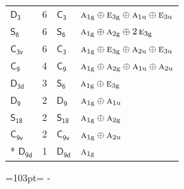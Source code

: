 \documentclass[10pt,a4paper]{article}
\newcommand{\needspace}[1]{\par\penalty-100\begingroup\dimen0=#1\relax\dimen2=\pagegoal
  \advance\dimen2-\pagetotal\ifdim\dimen0>\dimen2\relax\ifdim\dimen2>0pt\vfil\break\fi\fi
  \endgroup}
\numberwithin{equation}{section}
\newcommand{\grp}[1]{\mathsf{#1}}
\newcommand{\irr}[1]{\text{\normalfont\scshape #1}}
\newcommand{\ptag}[1]{\mathrm{#1}}
\newlength{\fillwidth}\newlength{\cellwidth}\newlength{\colwidth}
\begin{document}
{\begin{longtable}{@{}lrl>{\RaggedRight\arraybackslash}p{\fillwidth}@{}}
\href{D3.pdf}{$\grp{D_{3}}$} & 6 & \href{C3.pdf}{$\grp{C_{3}}$} & $\irr{a}_{1\ptag{g}}\oplus \irr{e}_{3\ptag{g}}\oplus \irr{a}_{1\ptag{u}}\oplus \irr{e}_{3\ptag{u}}$\\
\href{S6.pdf}{$\grp{S_{6}}$} & 6 & \href{S6.pdf}{$\grp{S_{6}}$} & $\irr{a}_{1\ptag{g}}\oplus \irr{a}_{2\ptag{g}}\oplus 2\,\irr{e}_{3\ptag{g}}$\\
\href{C3v.pdf}{$\grp{C_{3v}}$} & 6 & \href{C3.pdf}{$\grp{C_{3}}$} & $\irr{a}_{1\ptag{g}}\oplus \irr{e}_{3\ptag{g}}\oplus \irr{a}_{2\ptag{u}}\oplus \irr{e}_{3\ptag{u}}$\\
\href{C9.pdf}{$\grp{C_{9}}$} & 4 & \href{C9.pdf}{$\grp{C_{9}}$} & $\irr{a}_{1\ptag{g}}\oplus \irr{a}_{2\ptag{g}}\oplus \irr{a}_{1\ptag{u}}\oplus \irr{a}_{2\ptag{u}}$\\
\href{D3d.pdf}{$\grp{D_{3d}}$} & 3 & \href{S6.pdf}{$\grp{S_{6}}$} & $\irr{a}_{1\ptag{g}}\oplus \irr{e}_{3\ptag{g}}$\\
\href{D9.pdf}{$\grp{D_{9}}$} & 2 & \href{D9.pdf}{$\grp{D_{9}}$} & $\irr{a}_{1\ptag{g}}\oplus \irr{a}_{1\ptag{u}}$\\
\href{S18.pdf}{$\grp{S_{18}}$} & 2 & \href{S18.pdf}{$\grp{S_{18}}$} & $\irr{a}_{1\ptag{g}}\oplus \irr{a}_{2\ptag{g}}$\\
\href{C9v.pdf}{$\grp{C_{9v}}$} & 2 & \href{C9v.pdf}{$\grp{C_{9v}}$} & $\irr{a}_{1\ptag{g}}\oplus \irr{a}_{2\ptag{u}}$\\*
\href{D9d.pdf}{$\grp{D_{9d}}$} & 1 & \href{D9d.pdf}{$\grp{D_{9d}}$} & $\irr{a}_{1\ptag{g}}$\\
\bottomrule\end{longtable}}
\needspace{103pt}
\end{document}
